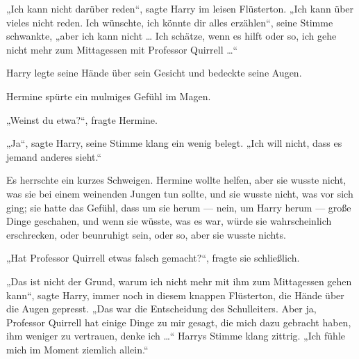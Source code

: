 „Ich kann nicht darüber reden“, sagte Harry im leisen Flüsterton.
„Ich kann über vieles nicht reden. Ich wünschte, ich könnte dir alles erzählen“, seine Stimme schwankte, „aber ich kann nicht … Ich schätze, wenn es hilft oder so, ich gehe nicht mehr zum Mittagessen mit Professor Quirrell …“

Harry legte seine Hände über sein Gesicht und bedeckte seine Augen.

Hermine spürte ein mulmiges Gefühl im Magen.

„Weinst du etwa?“, fragte Hermine.

„Ja“, sagte Harry, seine Stimme klang ein wenig belegt.
„Ich will nicht, dass es jemand anderes sieht.“

Es herrschte ein kurzes Schweigen. Hermine wollte helfen, aber sie wusste nicht, was sie bei einem weinenden Jungen tun sollte, und sie wusste nicht, was vor sich ging; sie hatte das Gefühl, dass um sie herum — nein, um Harry herum — große Dinge geschahen, und wenn sie wüsste, was es war, würde sie wahrscheinlich erschrecken, oder beunruhigt sein, oder so, aber sie wusste nichts.

„Hat Professor Quirrell etwas falsch gemacht?“, fragte sie schließlich.

„Das ist nicht der Grund, warum ich nicht mehr mit ihm zum Mittagessen gehen kann“, sagte Harry, immer noch in diesem knappen Flüsterton, die Hände über die Augen gepresst.
„Das war die Entscheidung des Schulleiters. Aber ja, Professor Quirrell hat einige Dinge zu mir gesagt, die mich dazu gebracht haben, ihm weniger zu vertrauen, denke ich …“ Harrys Stimme klang zittrig.
„Ich fühle mich im Moment ziemlich allein.“

